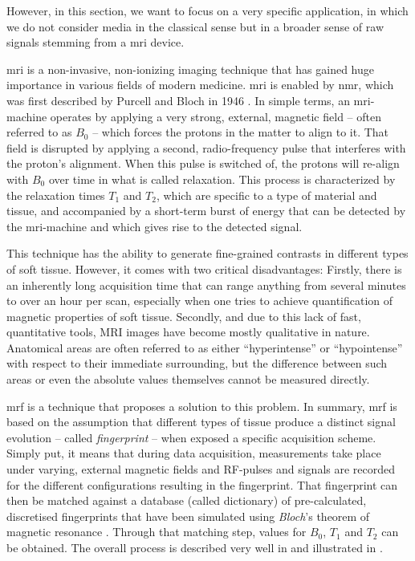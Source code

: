 However, in this section, we want to focus on a very specific application, in which we do not consider media in the classical sense but in a broader sense of raw signals stemming from a \acrfull{mri} device.

\acrshort{mri} is a non-invasive, non-ionizing imaging technique that has gained huge importance in various fields of modern medicine. \acrshort{mri} is enabled by \acrfull{nmr}, which was first described by Purcell and Bloch in 1946 \cite{Bloch:1946Nuclear,Purcell:1946Resonance}. In simple terms, an \acrshort{mri}-machine operates by applying a very strong, external, magnetic field -- often referred to as $B_0$ -- which forces the protons in the matter to align to it. That field is disrupted by applying a second, radio-frequency pulse that interferes with the proton's alignment. When this pulse is switched of, the protons will re-align with $B_0$ over time in what is called relaxation. This process is characterized by the relaxation times $T_1$ and $T_2$, which are specific to a type of material and tissue, and accompanied by a short-term burst of energy that can be detected by the \acrshort{mri}-machine and which gives rise to the detected signal.

This technique has the ability to generate fine-grained contrasts in different types of soft tissue. However, it comes with two critical disadvantages: Firstly, there is an inherently long acquisition time that can range anything from several minutes to over an hour per scan, especially when one tries to achieve quantification of magnetic properties of soft tissue. Secondly, and due to this lack of fast, quantitative tools, MRI images have become mostly qualitative in nature. Anatomical areas are often referred to as either ``hyperintense'' or ``hypointense'' with respect to their immediate surrounding, but the difference between such areas or even the absolute values themselves cannot be measured directly.

\acrfull{mrf} is a technique \cite{Ma:2013Magnetic} that proposes a solution to this problem. In summary, \acrshort{mrf} is based on the assumption that different types of tissue produce a distinct signal evolution -- called \emph{fingerprint} -- when exposed a specific acquisition scheme. Simply put, it means that during data acquisition, measurements take place under varying, external magnetic fields and RF-pulses and signals are recorded for the different configurations resulting in the fingerprint. That fingerprint can then be matched against a database (called dictionary) of pre-calculated, discretised fingerprints that have been simulated using \emph{Bloch}'s theorem of magnetic resonance \cite{Bloch:1946Nuclear}. Through that matching step, values for $B_0$, $T_1$ and $T_2$ can be obtained. The overall process is described very well in \cite{Bipin:2019Magnetic} and illustrated in .

